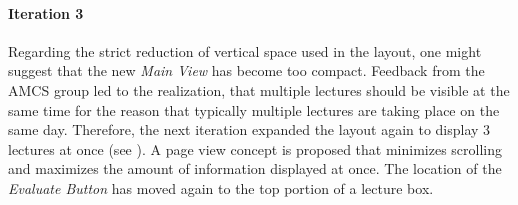 \paragraph{Iteration 3}
Regarding the strict reduction of vertical space used in the layout, one might suggest that the new \emph{Main View} has become too compact.
Feedback from the AMCS group led to the realization, that multiple lectures should be visible at the same time for the reason that typically multiple lectures are taking place on the same day.
Therefore, the next iteration expanded the layout again to display 3 lectures at once (see ). A page view concept is proposed that minimizes scrolling and maximizes the amount of information displayed at once. The location of the \emph{Evaluate Button} has moved again to the top portion of a lecture box.

